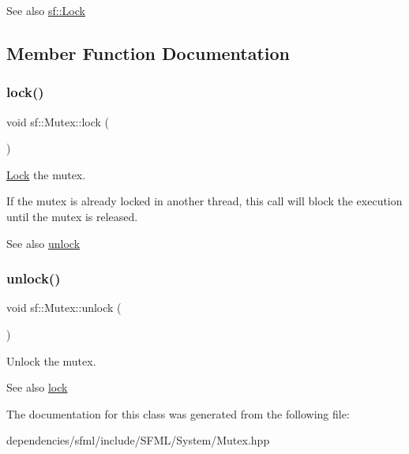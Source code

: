 \begin{DoxySeeAlso}{See also}
\hyperlink{classsf_1_1_lock}{sf\+::\+Lock} 
\end{DoxySeeAlso}


\subsection{Member Function Documentation}
\mbox{\label{classsf_1_1_mutex_a1a16956a6bbea764480c1b80f2e45763}} 
\subsubsection{\texorpdfstring{lock()}{lock()}}
{\footnotesize\ttfamily void sf\+::\+Mutex\+::lock (\begin{DoxyParamCaption}{ }\end{DoxyParamCaption})}



\hyperlink{classsf_1_1_lock}{Lock} the mutex. 

If the mutex is already locked in another thread, this call will block the execution until the mutex is released.

\begin{DoxySeeAlso}{See also}
\hyperlink{classsf_1_1_mutex_ade71268ffc5e80756652058b01c23c33}{unlock} 
\end{DoxySeeAlso}
\mbox{\label{classsf_1_1_mutex_ade71268ffc5e80756652058b01c23c33}} 
\subsubsection{\texorpdfstring{unlock()}{unlock()}}
{\footnotesize\ttfamily void sf\+::\+Mutex\+::unlock (\begin{DoxyParamCaption}{ }\end{DoxyParamCaption})}



Unlock the mutex. 

\begin{DoxySeeAlso}{See also}
\hyperlink{classsf_1_1_mutex_a1a16956a6bbea764480c1b80f2e45763}{lock} 
\end{DoxySeeAlso}


The documentation for this class was generated from the following file\+:\begin{DoxyCompactItemize}
\item 
dependencies/sfml/include/\+S\+F\+M\+L/\+System/Mutex.\+hpp\end{DoxyCompactItemize}
